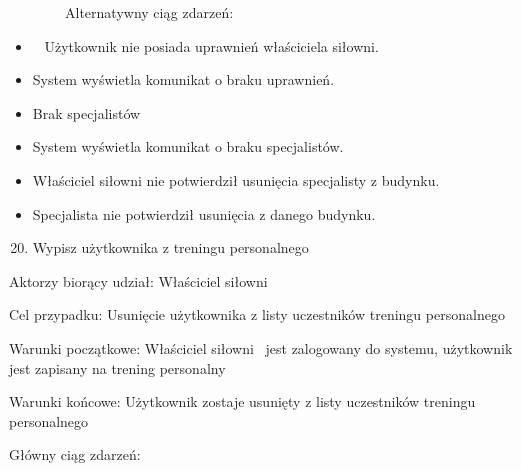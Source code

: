 \documentclass[
]{article}
\providecommand{\tightlist}{%
  \setlength{\itemsep}{0pt}\setlength{\parskip}{0pt}}
\begin{document}
{~~~~~~~~Alternatywny ciąg zdarzeń:}

\begin{itemize}
\tightlist
\item
  {~ Użytkownik nie posiada uprawnień właściciela siłowni.}
\end{itemize}

\begin{itemize}
\tightlist
\item
  {System wyświetla komunikat o braku uprawnień.}
\end{itemize}

\begin{itemize}
\tightlist
\item
  {Brak specjalistów}
\end{itemize}

\begin{itemize}
\tightlist
\item
  {System wyświetla komunikat o braku specjalistów.}
\end{itemize}

\begin{itemize}
\tightlist
\item
  {Właściciel siłowni nie potwierdził usunięcia specjalisty z budynku.}
\item
  {Specjalista nie potwierdził usunięcia z danego budynku.\\
  }
\end{itemize}

{}

{}

{}

\begin{enumerate}
\setcounter{enumi}{19}
\tightlist
\item
  {Wypisz użytkownika z treningu personalnego}
\end{enumerate}

{Aktorzy biorący udział: Właściciel siłowni}

{Cel przypadku: Usunięcie użytkownika z listy uczestników treningu
personalnego}

{Warunki początkowe: Właściciel siłowni ~jest zalogowany do systemu,
użytkownik jest zapisany na trening personalny}

{Warunki końcowe: Użytkownik zostaje usunięty z listy uczestników
treningu personalnego}

{Główny ciąg zdarzeń:}
\end{document}
